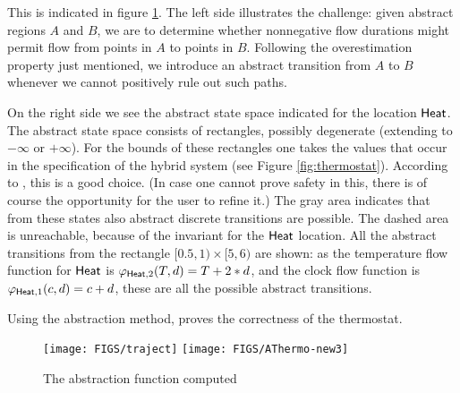 \documentclass[runningheads]{llncs}
\newcommand{\ADAM}[1] {\todo{\textsc{Adam says}: #1}}
\def\phi{\varphi}
\newcommand{\weg}[1]{}
\newcommand{\Heat}{{\sf Heat}}
\newcommand{\doubleheadrightarrow}{\mathrel{\rightarrow\!\!\!\!\rightarrow}}
\newcommand{\attrans}{\stackrel{A}{\doubleheadrightarrow_{CD}}}
\newcommand{\acontrans}{\stackrel{A}{\rightarrow_C}}
\newcommand{\adistrans}{\stackrel{A}{\rightarrow_D}}
\begin{document}
This is indicated in figure \ref{fig:abstraction}. The left side illustrates
the challenge: given abstract regions $A$ and $B$, we are to determine
whether nonnegative flow durations might permit flow from points in $A$ to points in $B$.
Following the overestimation property just mentioned, we introduce an abstract transition from $A$ to $B$ whenever we cannot positively rule out such paths.

On the right side we see the abstract state space indicated for the
location $\Heat$. The abstract state space consists of rectangles,
possibly degenerate (extending to $-\infty$ or $+\infty$). For the
bounds of these rectangles one takes the values that occur in the
specification of the hybrid system (see Figure
\ref{fig:thermostat}). According to \cite{alur}, this is a good
choice. (In case one cannot prove safety in this, there is of course
the opportunity for the user to refine it.)  The gray area indicates
that from these states also abstract discrete transitions are
possible. The dashed area is unreachable, because of the invariant for
the $\Heat$ location. %
All the abstract
transitions from the rectangle $[0.5,1) \times[5,6)$ are shown: as the
    temperature flow function for $\Heat$ is $\phi_{\Heat,2}(T,d)= T +
    2 * d$, and the clock flow function is $\phi_{\Heat,1}(c,d) = c +
    d$, these are all the possible abstract transitions.

Using the abstraction method, \cite{alur} proves the correctness of the thermostat.

\begin{center}
\begin{figure}[htb!]
    \texttt{[image: FIGS/traject]}
    \texttt{[image: FIGS/AThermo-new3]}
\caption{The abstraction function computed
\label{fig:abstraction}}
\end{figure}
\end{center}
\weg{ %
There is a slight subtlety with the abstract transitions that we want
to consider. If we just take $\attrans$ to be the reflexive transitive
closure of $\acontrans \cup \adistrans$, we get far too many abstract
traces. (There is no problem with the correctness of the method --
Figure \ref{diag:abstraction} still applies -- but we get way too many
traces to be able to prove any system safe.) The problem lies in the
fact that there is no transition from any point in $[0.5,1)
  \times[5,6)$ to $[0.5,1) \times[9,10)$, but the transitive closure
        of $\adistrans$ gives us such a transition anyway.
}
\end{document}
